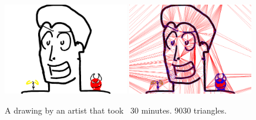 \documentclass[review]{acmsiggraph}
\begin{document}







\begin{figure}
    \centering
        \includegraphics[width=0.49\textwidth]{images/facezoom}
        \includegraphics[width=0.49\textwidth]{images/facezoomtriangles}
    \caption{A drawing by an artist that took ~30 minutes. 9030 triangles.} %
    \label{fig:face}
\end{figure}
\end{document}

